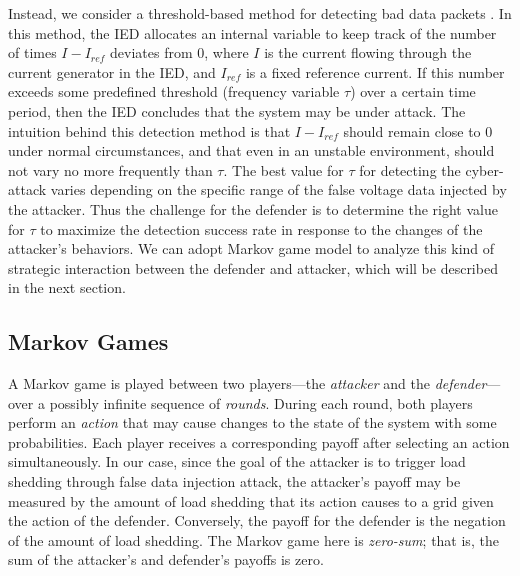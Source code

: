 
Instead, we consider a threshold-based method for detecting bad data
packets \cite{law2012security}. In this method, the IED allocates an
internal variable to keep track of the number of times $I - I_{ref}$
deviates from 0, where $I$ is the current flowing through the current
generator in the IED, and $I_{ref}$ is a fixed reference current. If
this number exceeds some predefined threshold (frequency variable $\tau$) over a certain time
period, then the IED concludes that the
system may be under attack. The intuition behind this detection method
is that $I - I_{ref}$ should remain close to 0 under normal
circumstances, and that even in an unstable environment, should not
vary no more frequently than $\tau$. The best value for $\tau$ for detecting the cyber-attack varies depending on the specific range of the false voltage data injected by the attacker. Thus the challenge for the defender is to determine the right value for $\tau$ to maximize the detection success rate in response to the changes of the attacker's behaviors. We can adopt Markov game model to analyze this kind of strategic interaction between the defender and attacker, which will be described in the next section.
 
\subsection{Markov Games}

A Markov game is played between two players---the \textit{attacker}
and the \textit{defender}---over a possibly infinite sequence of
\textit{rounds}. During each round, both players perform an
\textit{action} that may cause changes to the state of the system with
some probabilities. Each player receives a corresponding payoff after
selecting an action simultaneously. In our case, since the goal of the
attacker is to trigger load shedding through false data injection
attack, the attacker's payoff may be measured by the amount of load
shedding that its action causes to a grid given the action of the
defender. Conversely, the payoff for the defender is the negation of
the amount of load shedding. The Markov game here is
\textit{zero-sum}; that is, the sum of the attacker's and defender's
payoffs is zero.

